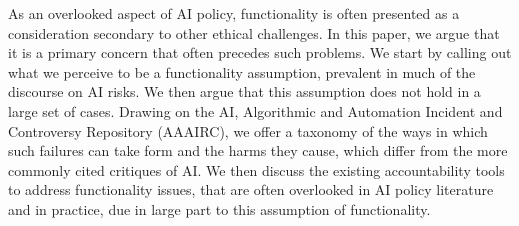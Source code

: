 \documentclass[acmconf,manuscript,screen,natbib=true]{acmart}
\begin{document}

As an overlooked aspect of AI policy, functionality is often presented as a consideration secondary to other ethical challenges. In this paper, we argue that it is a primary concern that often precedes such problems.
We start by calling out what we perceive to be a functionality assumption, prevalent in much of the discourse on AI risks. We then %
argue that this assumption does not hold in a large set of cases. %
Drawing on the AI, Algorithmic and Automation Incident and Controversy Repository (AAAIRC), we offer a taxonomy of the ways in which such failures can take form and the harms they cause, which differ from the more commonly cited critiques of AI.
We then discuss the existing accountability tools to address functionality issues, that are often overlooked in AI policy literature and in practice, due in large part to this assumption of functionality. 


\end{document}
